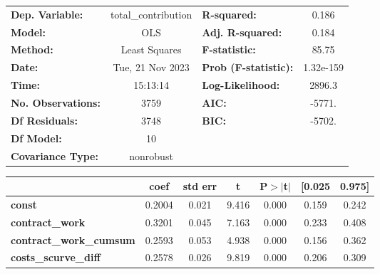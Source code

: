 \begin{center}
\begin{tabular}{lclc}
\toprule
\textbf{Dep. Variable:}                   & total\_contribution & \textbf{  R-squared:         } &     0.186   \\
\textbf{Model:}                           &         OLS         & \textbf{  Adj. R-squared:    } &     0.184   \\
\textbf{Method:}                          &    Least Squares    & \textbf{  F-statistic:       } &     85.75   \\
\textbf{Date:}                            &   Tue, 21 Nov 2023  & \textbf{  Prob (F-statistic):} & 1.32e-159   \\
\textbf{Time:}                            &       15:13:14      & \textbf{  Log-Likelihood:    } &    2896.3   \\
\textbf{No. Observations:}                &          3759       & \textbf{  AIC:               } &    -5771.   \\
\textbf{Df Residuals:}                    &          3748       & \textbf{  BIC:               } &    -5702.   \\
\textbf{Df Model:}                        &            10       & \textbf{                     } &             \\
\textbf{Covariance Type:}                 &      nonrobust      & \textbf{                     } &             \\
\bottomrule
\end{tabular}
\begin{tabular}{lcccccc}
                                          & \textbf{coef} & \textbf{std err} & \textbf{t} & \textbf{P$> |$t$|$} & \textbf{[0.025} & \textbf{0.975]}  \\
\midrule
\textbf{const}                            &       0.2004  &        0.021     &     9.416  &         0.000        &        0.159    &        0.242     \\
\textbf{contract\_work}                   &       0.3201  &        0.045     &     7.163  &         0.000        &        0.233    &        0.408     \\
\textbf{contract\_work\_cumsum}           &       0.2593  &        0.053     &     4.938  &         0.000        &        0.156    &        0.362     \\
\textbf{costs\_scurve\_diff}              &       0.2578  &        0.026     &     9.819  &         0.000        &        0.206    &        0.309     \\

\end{tabular}
\end{center}

